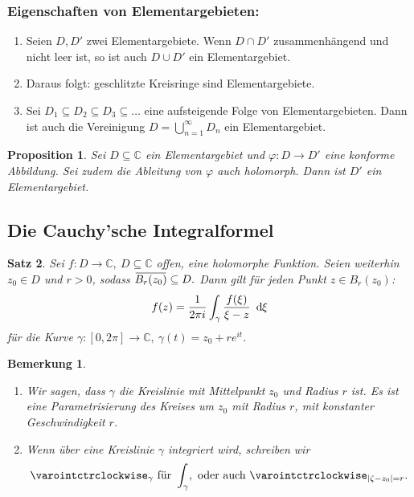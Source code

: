 \documentclass[a4paper,12pt]{article}
\theoremstyle{newthm}
\newtheorem{thm}{Satz}[subsection]
\newtheorem{prop}[thm]{Proposition}
\theoremstyle{newdef}
\theoremstyle{newrem}
\newtheorem*{rem}{Bemerkung}
\newcommand{\C}{\mathbb{C}}
\renewcommand{\d}{\ \operatorname{d}\hspace{-2px}}
\newcommand{\overbar}[1]{\mkern 1.5mu\overline{\mkern-1.5mu#1\mkern-1.5mu}\mkern 1.5mu}
\begin{document}
		\subsubsection*{Eigenschaften von Elementargebieten:}
		\begin{enumerate}
			\item Seien $ D,D' $ zwei Elementargebiete. Wenn $ D \cap D' $ zusammenhängend und nicht leer ist, so ist auch $ D \cup D' $ ein Elementargebiet.
			\item Daraus folgt: geschlitzte Kreisringe sind Elementargebiete.
			\item Sei $ D_1 \subseteq D_2 \subseteq D_3 \subseteq \dots $ eine aufsteigende Folge von Elementargebieten. Dann ist auch die Vereinigung $ D = \bigcup_{n=1}^\infty D_n $ ein Elementargebiet.
		\end{enumerate}
		
		\begin{prop}
			Sei $ D \subseteq \C $ ein Elementargebiet und $ \varphi: D \to D' $ eine konforme Abbildung. Sei zudem die Ableitung von $\varphi$ auch holomorph. Dann ist $D'$ ein Elementargebiet.
		\end{prop}
		
	
	\subsection{Die Cauchy'sche Integralformel}
		
		\begin{thm}
			Sei $ f: D \to \C,\ D \subseteq \C $ offen, eine holomorphe Funktion. Seien weiterhin $ z_0 \in D $ und $ r > 0 $, sodass $ \overbar{B_r(z_0)} \subseteq D. $ Dann gilt für jeden Punkt $ z \in B_r(z_0) $:
			\[ f(z) = \frac{1}{2\pi i} \int_\gamma \frac{f(\xi)}{\xi - z} \d \xi \]
			für die Kurve $ \gamma: [0,2\pi] \to \C,\ \gamma(t) = z_0 + re^{it}. $
		\end{thm}
		
		\begin{rem}
			\begin{enumerate}[label = {\alph*})]
				\item Wir sagen, dass $\gamma$ die Kreislinie mit Mittelpunkt $z_0$ und Radius $r$ ist. Es ist eine Parametrisierung des Kreises um $z_0$ mit Radius $r$, mit konstanter Geschwindigkeit $r$.
				\item Wenn über eine Kreislinie $\gamma$ integriert wird, schreiben wir 
				$$ \varointctrclockwise_\gamma\ \text{für } \int_\gamma,\ \text{oder auch } \varointctrclockwise_{|\zeta - z_0|=r}. $$
			\end{enumerate}
		\end{rem}
		
\end{document}
